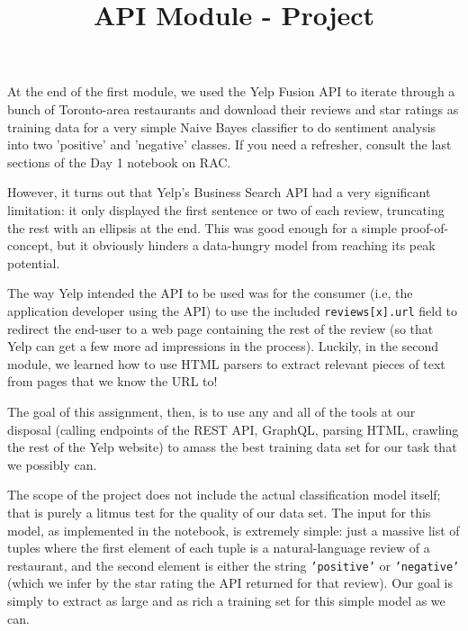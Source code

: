\documentclass{article}
\begin{document}
\title{API Module - Project}
\maketitle

At the end of the first module, we used the Yelp Fusion API to iterate through a bunch of Toronto-area restaurants and download their reviews and star ratings as training data for a very simple Naive Bayes classifier to do sentiment analysis into two 'positive' and 'negative' classes. If you need a refresher, consult the last sections of the Day 1 notebook on RAC.

However, it turns out that Yelp's Business Search API had a very significant limitation: it only displayed the first sentence or two of each review, truncating the rest with an ellipsis at the end. This was good enough for a simple proof-of-concept, but it obviously hinders a data-hungry model from reaching its peak potential.

The way Yelp intended the API to be used was for the consumer (i.e, the application developer using the API) to use the included \texttt{reviews[x].url} field to redirect the end-user to a web page containing the rest of the review (so that Yelp can get a few more ad impressions in the process). Luckily, in the second module, we learned how to use HTML parsers to extract relevant pieces of text from pages that we know the URL to!

The goal of this assignment, then, is to use any and all of the tools at our disposal (calling endpoints of the REST API, GraphQL, parsing HTML, crawling the rest of the Yelp website) to amass the best training data set for our task that we possibly can.

The scope of the project does not include the actual classification model itself; that is purely a litmus test for the quality of our data set. The input for this model, as implemented in the notebook, is extremely simple: just a massive list of tuples where the first element of each tuple is a natural-language review of a restaurant, and the second element is either the string \texttt{'positive'} or \texttt{'negative'} (which we infer by the star rating the API returned for that review). Our goal is simply to extract as large and as rich a training set for this simple model as we can.
\end{document}
